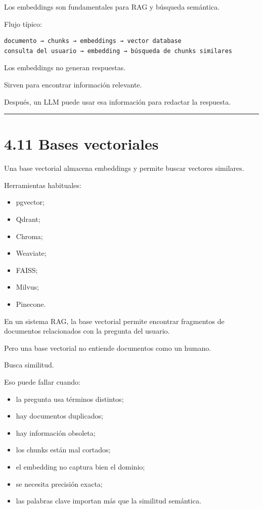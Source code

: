 Los embeddings son fundamentales para RAG y búsqueda semántica.

Flujo típico:

\begin{lstlisting}
documento → chunks → embeddings → vector database
consulta del usuario → embedding → búsqueda de chunks similares
\end{lstlisting}

Los embeddings no generan respuestas.

Sirven para encontrar información relevante.

Después, un LLM puede usar esa información para redactar la respuesta.

\begin{center}\rule{0.5\linewidth}{0.5pt}\end{center}

\section{4.11 Bases vectoriales}\label{bases-vectoriales}

Una base vectorial almacena embeddings y permite buscar vectores
similares.

Herramientas habituales:

\begin{itemize}
\tightlist
\item
  pgvector;
\item
  Qdrant;
\item
  Chroma;
\item
  Weaviate;
\item
  FAISS;
\item
  Milvus;
\item
  Pinecone.
\end{itemize}

En un sistema RAG, la base vectorial permite encontrar fragmentos de
documentos relacionados con la pregunta del usuario.

Pero una base vectorial no entiende documentos como un humano.

Busca similitud.

Eso puede fallar cuando:

\begin{itemize}
\tightlist
\item
  la pregunta usa términos distintos;
\item
  hay documentos duplicados;
\item
  hay información obsoleta;
\item
  los chunks están mal cortados;
\item
  el embedding no captura bien el dominio;
\item
  se necesita precisión exacta;
\item
  las palabras clave importan más que la similitud semántica.
\end{itemize}

